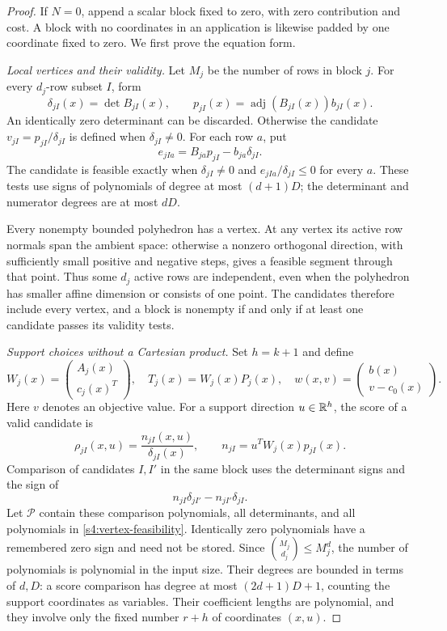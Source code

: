 \begin{proof}
If $N=0$, append a scalar block fixed to zero, with zero contribution
and cost. A block with no coordinates in an application is likewise
padded by one coordinate fixed to zero. We first prove the equation form.

\emph{Local vertices and their validity.}
Let $M_j$ be the number of rows in block $j$. For every $d_j$-row
subset $I$, form
\[
 \delta_{jI}(x)=\det B_{jI}(x),\qquad
 p_{jI}(x)=\operatorname{adj}(B_{jI}(x))b_{jI}(x).
\]
An identically zero determinant can be discarded. Otherwise the
candidate $v_{jI}=p_{jI}/\delta_{jI}$ is defined when
$\delta_{jI}\ne0$. For each row $a$, put
\begin{equation}
 e_{jIa}=B_{ja}p_{jI}-b_{ja}\delta_{jI}.
 \label{s4:vertex-feasibility}
\end{equation}
The candidate is feasible exactly when $\delta_{jI}\ne0$ and
$e_{jIa}/\delta_{jI}\le0$ for every $a$. These tests use signs of
polynomials of degree at most $(d+1)D$; the determinant and numerator
degrees are at most $dD$.

Every nonempty bounded polyhedron has a vertex. At any vertex its
active row normals span the ambient space: otherwise a nonzero
orthogonal direction, with sufficiently small positive and negative
steps, gives a feasible segment through that point. Thus some $d_j$
active rows are independent, even when the polyhedron has smaller
affine dimension or consists of one point. The candidates therefore
include every vertex, and a block is nonempty if and only if at least
one candidate passes its validity tests.

\emph{Support choices without a Cartesian product.}
Set $h=k+1$ and define
\[
 W_j(x)=\begin{pmatrix}A_j(x)\\c_j(x)^T\end{pmatrix},\quad
 T_j(x)=W_j(x)P_j(x),\quad
 w(x,v)=\begin{pmatrix}b(x)\\v-c_0(x)\end{pmatrix}.
\]
Here $v$ denotes an objective value. For a support direction
$u\in\mathbb R^h$, the score of a valid candidate is
\[
 \rho_{jI}(x,u)=\frac{n_{jI}(x,u)}{\delta_{jI}(x)},\qquad
 n_{jI}=u^TW_j(x)p_{jI}(x).
\]
Comparison of candidates $I,I'$ in the same block uses the determinant
signs and the sign of
\begin{equation}
 n_{jI}\delta_{jI'}-n_{jI'}\delta_{jI}.
 \label{s4:score-comparison}
\end{equation}
Let $\mathcal P$ contain these comparison polynomials, all determinants,
and all polynomials in \eqref{s4:vertex-feasibility}. Identically zero
polynomials have a remembered zero sign and need not be stored. Since
$\binom{M_j}{d_j}\le M_j^d$, the number of polynomials is polynomial
in the input size. Their degrees are bounded in terms of $d,D$: a
score comparison has degree at most $(2d+1)D+1$, counting the support
coordinates as variables. Their coefficient lengths are polynomial,
and they involve only the fixed
number $r+h$ of coordinates $(x,u)$.


\end{proof}
